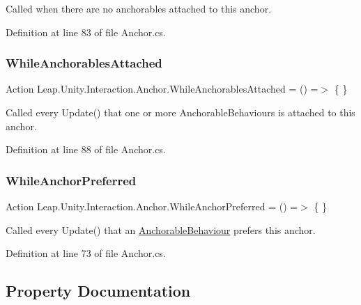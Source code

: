 Called when there are no anchorables attached to this anchor. 



Definition at line 83 of file Anchor.\+cs.

\mbox{\label{class_leap_1_1_unity_1_1_interaction_1_1_anchor_af4206b9e6f47ad010b61035b4bc5fe5f}} 
\subsubsection{\texorpdfstring{WhileAnchorablesAttached}{WhileAnchorablesAttached}}
{\footnotesize\ttfamily Action Leap.\+Unity.\+Interaction.\+Anchor.\+While\+Anchorables\+Attached = () =$>$ \{ \}}



Called every Update() that one or more Anchorable\+Behaviours is attached to this anchor. 



Definition at line 88 of file Anchor.\+cs.

\mbox{\label{class_leap_1_1_unity_1_1_interaction_1_1_anchor_a98e0e252c0ef198399129d56f2586061}} 
\subsubsection{\texorpdfstring{WhileAnchorPreferred}{WhileAnchorPreferred}}
{\footnotesize\ttfamily Action Leap.\+Unity.\+Interaction.\+Anchor.\+While\+Anchor\+Preferred = () =$>$ \{ \}}



Called every Update() that an \mbox{\hyperlink{class_leap_1_1_unity_1_1_interaction_1_1_anchorable_behaviour}{Anchorable\+Behaviour}} prefers this anchor. 



Definition at line 73 of file Anchor.\+cs.



\subsection{Property Documentation}
\mbox{\label{class_leap_1_1_unity_1_1_interaction_1_1_anchor_ac55ba01abd9142448ba2ec9dc1f66baa}} 
